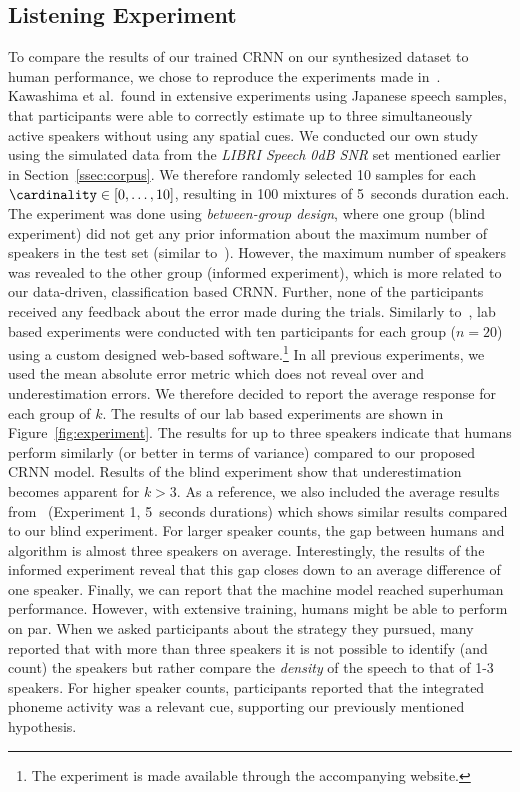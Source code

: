 \subsection{Listening Experiment}%
\label{ssec:listening_experiment}
To compare the results of our trained CRNN on our synthesized dataset to human performance, we chose to reproduce the experiments made in~\cite{kawashima15, kashino96}.
Kawashima et al.\ found in extensive experiments using Japanese speech samples, that participants were able to correctly estimate up to three simultaneously active speakers without using any spatial cues.
We conducted our own study using the simulated data from the \emph{LIBRI Speech 0dB SNR} set mentioned earlier in Section~\ref{ssec:corpus}.
We therefore randomly selected 10 samples for each \(\cardinality \in [0, \ldots, 10]\), resulting in 100 mixtures of 5~seconds duration each.
The experiment was done using \emph{between-group design}, where one group (blind experiment) did not get any prior information about the maximum number of speakers in the test set (similar to~\cite{kawashima15}).
However, the maximum number of speakers was revealed to the other group (informed experiment), which is more related to our data-driven, classification based CRNN.
Further, none of the participants received any feedback about the error made during the trials.
Similarly to~\cite{kawashima15}, lab based experiments were conducted with ten participants for each group (\(n=20\)) using a custom designed web-based software.\footnote{The experiment is made available through the accompanying website.}
In all previous experiments, we used the mean absolute error metric which does not reveal over and underestimation errors.
We therefore decided to report the average response for each group of \(k\).
The results of our lab based experiments are shown in Figure~\ref{fig:experiment}.
The results for up to three speakers indicate that humans perform similarly (or better in terms of variance) compared to our proposed CRNN model.
Results of the blind experiment show that underestimation becomes apparent for \(k > 3\).
As a reference, we also included the average results from~\cite{kawashima15} (Experiment 1, 5~seconds durations) which shows similar results compared to our blind experiment.
For larger speaker counts, the gap between humans and algorithm is almost three speakers on average.
Interestingly, the results of the informed experiment reveal that this gap closes down to an average difference of one speaker.
Finally, we can report that the machine model reached superhuman performance. However, with extensive training, humans might be able to perform on par.
When we asked participants about the strategy they pursued, many reported that with more than three speakers it is not possible to identify (and count) the speakers but rather compare the \emph{density} of the speech to that of 1-3 speakers.
For higher speaker counts, participants reported that the integrated phoneme activity was a relevant cue, supporting our previously mentioned hypothesis.

